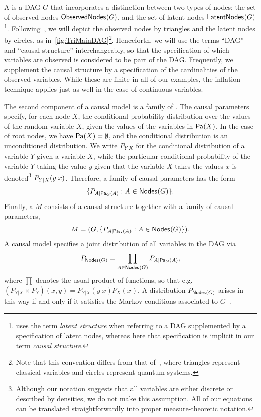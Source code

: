 \documentclass[aps,english,10pt,superscriptaddress,onecolumn,twoside,longbibliography,pra,floatfix,fleqn,nofootinbib]{revtex4-1}%
\newcommand*{\tblue}[1]{{\color{MidnightBlue}{\textbf{#1}}}}
\theoremstyle{definition}
\newcounter{example}[section]
\newcommand{\p}[2][]{{P_{#1}}\parenths{#2}}
\newcommand{\pfunc}[1]{P_{#1}}
\newcommand{\Pa}[2][]{{\mathsf{Pa}_{#1}}\parenths{#2}}
\newcommand{\SmallNamedFunction}[3][]{\operatorname{\mathsf{#2}}_{#1}\parenths{#3}}
\newcommand{\nodes}[1]{\SmallNamedFunction{Nodes}{#1}}
\newcommand{\obsnodes}[1]{\SmallNamedFunction{ObservedNodes}{#1}}
\newcommand{\latnodes}[1]{\SmallNamedFunction{LatentNodes}{#1}}
\DeclarePairedDelimiter{\parenths}{\lparen}{\rparen}
\begin{document}
A \tblue{causal structure} is a DAG $G$ that incorporates a distinction between two types of nodes: the set of observed nodes $\obsnodes{G}$, and the set of latent nodes $\latnodes{G}$\footnote{\citet[Def. 2.3.2]{pearl2009causality} uses the term \emph{latent structure} when referring to a DAG supplemented by a specification of latent nodes, whereas here that specification is implicit in our term \emph{causal structure}.}. 
Following~\cite{pusey2014gdag}, we will depict the observed nodes by triangles and the latent nodes by circles, as in~\cref{fig:TriMainDAG}\footnote{Note that this convention differs from that of~\cite{leifer2013conditionalstates}, where triangles represent classical variables and circles represent quantum systems.}.
Henceforth, we will use the terms ``DAG'' and ``causal structure'' interchangeably, so that the specification of which variables are observed is considered to be part of the DAG.
Frequently, we supplement the causal structure by a specification of the cardinalities of the observed variables. While these are finite in all of our examples, the inflation technique applies just as well in the case of continuous variables.

 The second component of a causal model is a family of \tblue{causal parameters}.
The causal parameters specify, for each node $X$, the conditional probability distribution over the values of the random variable $X$, given the values of the variables in $\Pa{X}$.  In the case of root nodes, we have $\Pa{X} = \emptyset$, and the conditional distribution is an unconditioned distribution.
We write $\pfunc{Y|X}$ for the conditional distribution of a variable $Y$ given a variable $X$, while the particular conditional probability of the variable $Y$ taking the value $y$ given that the variable $X$ takes the values $x$ is denoted\footnote{Although our notation suggests that all variables are either discrete or described by densities, we do not make this assumption.  All of our equations can be translated straightforwardly into proper measure-theoretic notation.} $\p[Y|X]{y|x}$.    Therefore, a family of causal parameters has the form
\begin{align}
 \{ \pfunc{A|\Pa[G]{A}} : A \in \nodes{G} \}.
\end{align}
Finally, a \tblue{causal model} $M$ consists of a causal structure together with a family of causal parameters,
\[
	M = ( G,   \{ \pfunc{A|\Pa[G]{A}} : A \in \nodes{G} \}).
\]
A causal model specifies a joint distribution of all variables in the DAG via
\begin{align}\label{Markov}
P_{\nodes{G}} = \prod_{A\in \nodes{G}} \pfunc{A|\Pa[G]{A}},
\end{align}
where $\prod$ denotes the usual product of functions, so that e.g.~$(P_{Y|X} \times P_Y)(x,y) = P_{Y|X}(y|x) P_X(x)$. A distribution $P_{\nodes{G}}$ arises in this way if and only if it satisfies the Markov conditions associated to $G$~\cite[Sec.~1.2]{pearl2009causality}.
\end{document}
